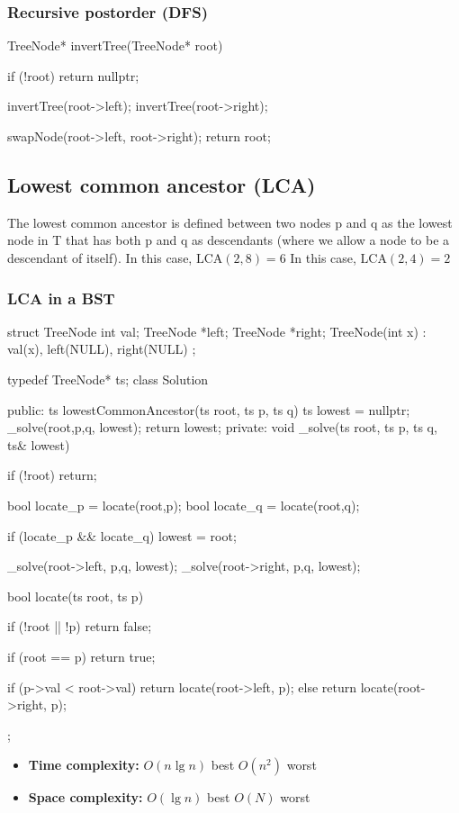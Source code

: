 \documentclass{report}
\begin{document}
\bigbreak \noindent 
\subsubsection{Recursive postorder (DFS)}
\bigbreak \noindent 
\begin{cppcode}
    TreeNode* invertTree(TreeNode* root) {
        if (!root) return nullptr;

        invertTree(root->left);
        invertTree(root->right);

        swapNode(root->left, root->right);
        return root;
    }
\end{cppcode}

\pagebreak 
\bigbreak \noindent 
\subsection{Lowest common ancestor (LCA)}
\bigbreak \noindent 
The lowest common ancestor is defined between two nodes p and q as the lowest node in T that has both p and q as descendants (where we allow a node to be a descendant of itself).
\bigbreak \noindent 
{}
\bigbreak \noindent 
In this case, $\text{LCA}(2,8) = 6$
\bigbreak \noindent 
{}
\bigbreak \noindent 
In this case, $\text{LCA}(2,4) = 2$

\pagebreak 
\subsubsection{LCA in a BST}
\bigbreak \noindent 
\begin{cppcode}
struct TreeNode {
    int val;
    TreeNode *left;
    TreeNode *right;
    TreeNode(int x) : val(x), left(NULL), right(NULL) {}
};

typedef TreeNode* ts;
class Solution {
public:
    ts lowestCommonAncestor(ts root, ts p, ts q) {
        ts lowest = nullptr;
        _solve(root,p,q, lowest);
        return lowest;
    }
private:
    void _solve(ts root, ts p, ts q, ts& lowest) {
        if (!root) return; 

        bool locate_p = locate(root,p);
        bool locate_q = locate(root,q);

        if (locate_p && locate_q) lowest = root;

        _solve(root->left, p,q, lowest);
        _solve(root->right, p,q, lowest);

    }
    bool locate(ts root, ts p) {
        if (!root || !p) return false;

        if (root == p) return true;

        if (p->val < root->val) return locate(root->left, p);
        else return locate(root->right, p);
    }
};
\end{cppcode}
\bigbreak \noindent 
\begin{itemize}
    \item \textbf{Time complexity: } $O(n\lg n) $ best $O(n^{2})$ worst
    \item \textbf{Space complexity: } $O(\lg n)$ best $O(N)$ worst
\end{itemize}
\end{document}
